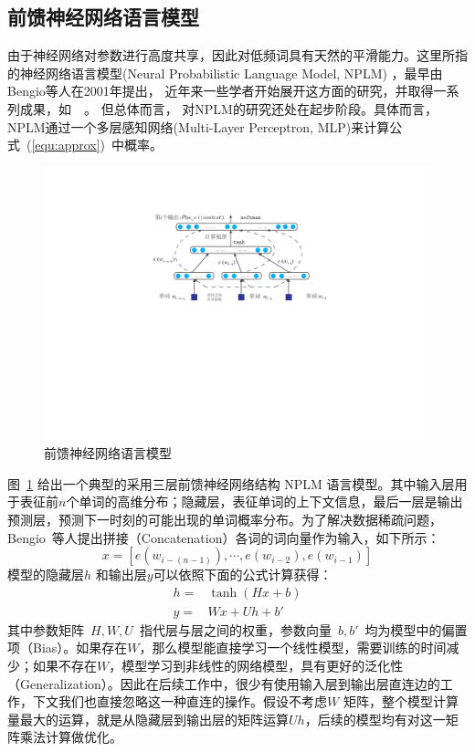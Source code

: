 \subsection{前馈神经网络语言模型}
由于神经网络对参数进行高度共享，因此对低频词具有天然的平滑能力。这里所指的神经网络语言模型(Neural Probabilistic Language Model, NPLM) ，最早由Bengio等人在2001年提出， 近年来一些学者开始展开这方面的研究，并取得一系列成果，如~\cite{DBLP:conf/acl/BaroniDK14,DBLP:journals/sigkdd/BellK07,DBLP:journals/pami/BengioCV13,DBLP:journals/tnn/BengioSF94}~。 但总体而言， 对NPLM的研究还处在起步阶段。具体而言，NPLM通过一个多层感知网络(Multi-Layer Perceptron, MLP)来计算公式~(\ref{equ:approx})~中概率。
\begin{figure}
  \centering
  \includegraphics[width=.85\linewidth]{./figures/nplm.pdf}
  \caption{前馈神经网络语言模型}\label{fig:nplm}
\end{figure}

图~\ref{fig:nplm} 给出一个典型的采用三层前馈神经网络结构 NPLM 语言模型。其中输入层用于表征前$n$个单词的高维分布；隐藏层，表征单词的上下文信息，最后一层是输出预测层，预测下一时刻的可能出现的单词概率分布。为了解决数据稀疏问题，Bengio~等人提出拼接（Concatenation）各词的词向量作为输入，如下所示：
\begin{equation}\label{equ:we}
  x = [e(w_{i-(n-1)}), \cdots , e(w_{i-2}), e{(w_{i-1})}]
\end{equation}
模型的隐藏层$h$ 和输出层$y$可以依照下面的公式计算获得：
\begin{equation}\label{equ:nplm}
\begin{split}
h =& \tanh(Hx+b) \\
y =&Wx + Uh +b'
\end{split}
\end{equation}
其中参数矩阵~$H,W,U$~指代层与层之间的权重，参数向量~$b,b'$~均为模型中的偏置项（Bias）。如果存在$W$，那么模型能直接学习一个线性模型，需要训练的时间减少；如果不存在$W$，模型学习到非线性的网络模型，具有更好的泛化性（Generalization）。因此在后续工作中，很少有使用输入层到输出层直连边的工作，下文我们也直接忽略这一种直连的操作。假设不考虑$W$ 矩阵，整个模型计算量最大的运算，就是从隐藏层到输出层的矩阵运算$Uh$，后续的模型均有对这一矩阵乘法计算做优化。

